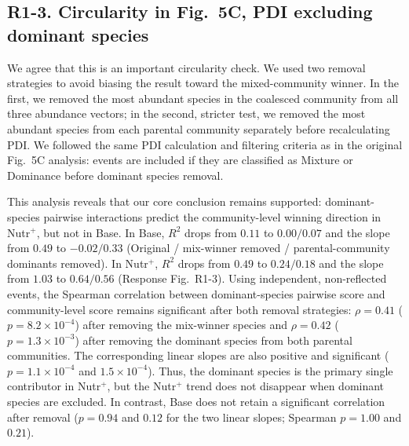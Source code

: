 \subsection*{R1-3. Circularity in Fig.~5C, PDI excluding dominant species}


\responselabel
We agree that this is an important circularity check. We used two removal strategies to avoid biasing the result toward the mixed-community winner. In the first, we removed the most abundant species in the coalesced community from all three abundance vectors; in the second, stricter test, we removed the most abundant species from each parental community separately before recalculating PDI. We followed the same PDI calculation and filtering criteria as in the original Fig.~5C analysis: events are included if they are classified as Mixture or Dominance before dominant species removal.

This analysis reveals that our core conclusion remains supported: dominant-species pairwise interactions predict the community-level winning direction in Nutr$^+$, but not in Base. In Base, $R^2$ drops from $0.11$ to $0.00 / 0.07$ and the slope from $0.49$ to $-0.02 / 0.33$ (Original / mix-winner removed / parental-community dominants removed). In Nutr$^+$, $R^2$ drops from $0.49$ to $0.24 / 0.18$ and the slope from $1.03$ to $0.64 / 0.56$ (Response Fig.~R1-3). Using independent, non-reflected events, the Spearman correlation between dominant-species pairwise score and community-level score remains significant after both removal strategies: $\rho = 0.41$ ($p = 8.2 \times 10^{-4}$) after removing the mix-winner species and $\rho = 0.42$ ($p = 1.3 \times 10^{-3}$) after removing the dominant species from both parental communities. The corresponding linear slopes are also positive and significant ($p = 1.1 \times 10^{-4}$ and $1.5 \times 10^{-4}$). Thus, the dominant species is the primary single contributor in Nutr$^+$, but the Nutr$^+$ trend does not disappear when dominant species are excluded. In contrast, Base does not retain a significant correlation after removal ($p = 0.94$ and $0.12$ for the two linear slopes; Spearman $p = 1.00$ and $0.21$).

